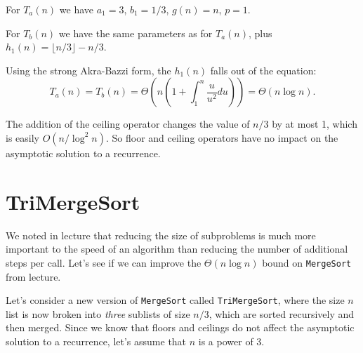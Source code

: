 \documentclass[12pt]{article}
\begin{document}
{\noindent For $T_a(n)$ we have $a_1 = 3$, $b_1 = 1/3$, $g(n) = n$, $p = 1$.

\noindent For $T_b(n)$ we have the same parameters as for $T_a(n)$, plus $h_1(n) = \lfloor n/3 \rfloor - n/3$. 

Using the strong Akra-Bazzi form, the $h_1(n)$ falls out of the equation:
$$T_a(n) = T_b(n) = \Theta(n(1+ \int_1^n \frac{u}{u^2} du)) = \Theta(n \log n).$$

The addition of the ceiling operator changes the value
of $n/3$ by at most 1, which is easily $O(n / \log^2 n)$.  So floor and
ceiling operators have no impact on the asymptotic solution to a recurrence.
}



\section{TriMergeSort}

We noted in lecture that reducing the size of subproblems is much more important to the speed of an algorithm than reducing the number of additional steps per call. Let's see if we can improve the $\Theta(n \log n)$ bound on {\tt MergeSort} from lecture.

Let's consider a new version of {\tt MergeSort} called {\tt TriMergeSort}, where the size $n$ list is now broken into \textit{three} sublists of size $n/3$, which are sorted recursively and then merged. Since we know that floors and ceilings do not affect the asymptotic solution to a recurrence, let's assume that $n$ is a power of 3.
\end{document}
